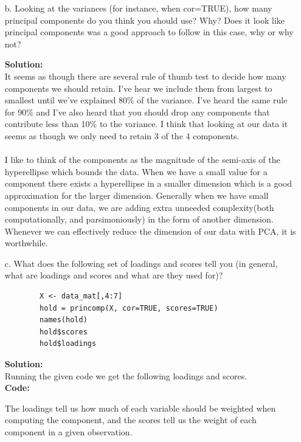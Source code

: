 \documentclass[12pt]{article}
\makeatletter
\theoremstyle{homework}
\newenvironment{exercise}[1]
{\def\@currentlabel{#1}\exercisecore}
{\endexercisecore}
\newcommand{\localhead}[1]{\par\smallskip\noindent\textbf{#1}\nobreak\\}%
\newcommand\solution{\localhead{Solution:}}
\makeatother
\begin{document}
\begin{exercise}{3}
\begin{enumerate}
    \item[b.] Looking at the variances (for instance, when cor=TRUE), how many principal components do you think you should use? Why? Does it look 
    like principal components was a good approach to follow in this case, why or why not?\\
    \solution It seems as though there are several rule of thumb test to decide how many components we should retain. I've hear we include them from largest to smallest until we've explained 80\% of the 
    variance. I've heard the same rule for 90\% and I've also heard that you should drop any components that contribute less than 10\% to the variance. I think that looking at our data it seems as though we only need to 
    retain 3 of the 4 components.\\\\
    I like to think of the components as the magnitude of the semi-axis of the hyperellipse which bounds the data. When we have a small value for a component there exists a hyperellipse in a smaller dimension which is a good approximation for the larger dimension.
    Generally when we have small components in our data, we are adding extra unneeded complexity(both computationally, and parsimoniously) in the form of another dimension. Whenever we can effectively reduce the dimension of our data with PCA, it is worthwhile. 
    \vspace{.15in}
    
    \item[c.] What does the following set of loadings and scores tell you (in general, what are loadings and scores and what are they used for)?\\
    \begin{footnotesize}
      \begin{verbatim}
        X <- data_mat[,4:7]
        hold = princomp(X, cor=TRUE, scores=TRUE)
        names(hold)
        hold$scores
        hold$loadings
      \end{verbatim}
    \end{footnotesize}
    \solution Running the given code we get the following loadings and scores. \\
    \textbf{Code:}
    \begin{center}
    
    \end{center}
    The loadings tell us how much of each variable should be weighted when computing the component, and the scores tell us the weight of each component in a given observation. 
    \vspace{.15in}



\end{enumerate}
\end{exercise}
\end{document}
